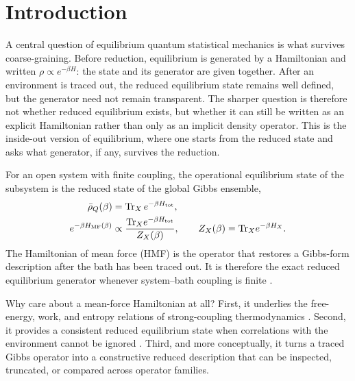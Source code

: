 \section{Introduction}
\label{sec:intro}

A central question of equilibrium quantum statistical mechanics is what
survives coarse-graining. Before reduction, equilibrium is generated by a
Hamiltonian and written $\rho\propto e^{-\beta H}$: the state and its generator
are given together. After an environment is traced out, the reduced
equilibrium state remains well defined, but the generator need not remain
transparent. The sharper question is therefore not whether reduced equilibrium
exists, but whether it can still be written as an explicit Hamiltonian rather
than only as an implicit density operator. This is the inside-out version of
equilibrium, where one starts from the reduced state and asks what generator,
if any, survives the reduction.

For an open system with finite coupling, the operational equilibrium state of
the subsystem is the reduced state of the global Gibbs ensemble,
\begin{align}
    \bar{\rho}_Q(\beta) &= \mathrm{Tr}_X\, e^{-\beta H_{\mathrm{tot}}},
    \label{eq:intro_rho_bar} \\
    e^{-\beta H_{\mathrm{MF}}(\beta)}
    &\propto \frac{\mathrm{Tr}_X e^{-\beta H_{\mathrm{tot}}}}{Z_X(\beta)},
    \qquad Z_X(\beta)=\mathrm{Tr}_X e^{-\beta H_X}.
    \label{eq:intro_hmf_def}
\end{align}
The Hamiltonian of mean force (HMF) is the operator that restores a Gibbs-form
description after the bath has been traced out. It is therefore the exact
reduced equilibrium generator whenever system--bath coupling is finite
\cite{campisiFluctuationTheoremArbitrary2009,talknerColloquiumStatisticalMechanics2020,trushechkinOpenQuantumSystem2022,seifertFirstSecondLaw2016,campbellRoadmapQuantumThermodynamics2026,binderThermodynamicsQuantumRegime2018}.

Why care about a mean-force Hamiltonian at all? First, it underlies the
free-energy, work, and entropy relations of strong-coupling thermodynamics
\cite{jarzynskiNonequilibriumWorkTheorem2004,campisiFluctuationTheoremArbitrary2009,seifertFirstSecondLaw2016,millerEntropyProduction2017,lacerdaQuantumThermodynamicsFast2023,BinderVinjanampathyModiGoold2015}.
Second, it provides a consistent reduced equilibrium state when correlations
with the environment cannot be ignored
\cite{pechukasReducedDynamicsNeed1994b,trushechkinOpenQuantumSystem2022,gelinThermodynamicsSubensembleCanonical2009a}.
Third, and more conceptually, it turns a traced Gibbs operator into a
constructive reduced description that can be inspected, truncated, or compared
across operator families.


